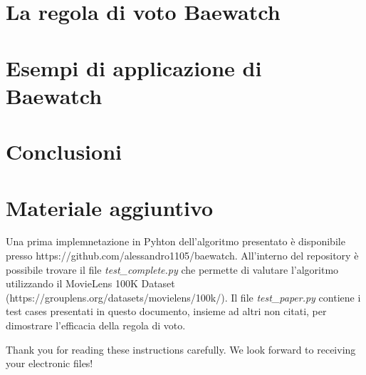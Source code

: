 \documentclass[letterpaper]{article}
\begin{document}
\section{La regola di voto Baewatch}

\section{Esempi di applicazione di Baewatch}

\section{Conclusioni}

\section{Materiale aggiuntivo}
Una prima implemnetazione in Pyhton dell'algoritmo presentato è disponibile presso https://github.com/alessandro1105/baewatch. All'interno del repository è possibile trovare il file \emph{test\_complete.py} che permette di valutare l'algoritmo utilizzando il MovieLens 100K Dataset (https://grouplens.org/datasets/movielens/100k/). Il file \emph{test\_paper.py} contiene i test cases presentati in questo documento, insieme ad altri non citati, per dimostrare l'efficacia della regola di voto.

\bigskip
\noindent Thank you for reading these instructions carefully. We look forward to receiving your electronic files!

 

\end{document}
